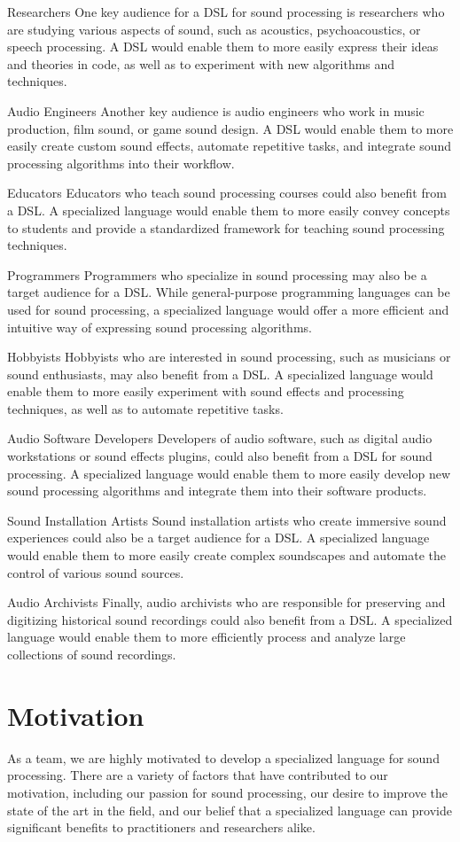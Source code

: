 Researchers
One key audience for a DSL for sound processing is researchers who are studying various aspects of sound, such as acoustics, psychoacoustics, or speech processing. A DSL would enable them to more easily express their ideas and theories in code, as well as to experiment with new algorithms and techniques.

Audio Engineers
Another key audience is audio engineers who work in music production, film sound, or game sound design. A DSL would enable them to more easily create custom sound effects, automate repetitive tasks, and integrate sound processing algorithms into their workflow.

Educators
Educators who teach sound processing courses could also benefit from a DSL. A specialized language would enable them to more easily convey concepts to students and provide a standardized framework for teaching sound processing techniques.

Programmers
Programmers who specialize in sound processing may also be a target audience for a DSL. While general-purpose programming languages can be used for sound processing, a specialized language would offer a more efficient and intuitive way of expressing sound processing algorithms.

Hobbyists
Hobbyists who are interested in sound processing, such as musicians or sound enthusiasts, may also benefit from a DSL. A specialized language would enable them to more easily experiment with sound effects and processing techniques, as well as to automate repetitive tasks.

Audio Software Developers
Developers of audio software, such as digital audio workstations or sound effects plugins, could also benefit from a DSL for sound processing. A specialized language would enable them to more easily develop new sound processing algorithms and integrate them into their software products.

Sound Installation Artists
Sound installation artists who create immersive sound experiences could also be a target audience for a DSL. A specialized language would enable them to more easily create complex soundscapes and automate the control of various sound sources.

Audio Archivists
Finally, audio archivists who are responsible for preserving and digitizing historical sound recordings could also benefit from a DSL. A specialized language would enable them to more efficiently process and analyze large collections of sound recordings.
\section{Motivation} 
As a team, we are highly motivated to develop a specialized language for sound processing. There are a variety of factors that have contributed to our motivation, including our passion for sound processing, our desire to improve the state of the art in the field, and our belief that a specialized language can provide significant benefits to practitioners and researchers alike.

